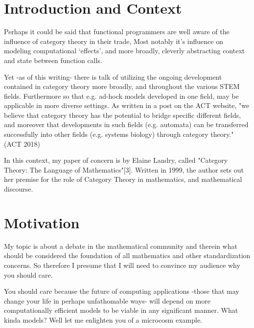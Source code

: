\section*{Introduction and Context}

Perhaps it could be said that functional programmers are well aware of the influence of category theory in their trade, Most notably it’s influence on modeling computational ‘effects’, and more broadly, cleverly abstracting context and state between function calls. 

Yet -as of this writing- there is talk of utilizing the ongoing development contained in category theory more broadly, and throughout the various STEM fields. Furthermore so that e.g. ad-hock models developed in one field, may be applicable in more diverse settings. As written in a post on the ACT website, "we believe that category theory has the potential to bridge specific different fields, and moreover that developments in such fields (e.g. automata) can be transferred successfully into other fields (e.g. systems biology) through category theory." (ACT 2018)

In this context, my paper of concern is by Elaine Landry, called "Category Theory: The Language of Mathematics"[3]. Written in 1999, the author sets out her premise for the role of Category Theory in mathematics, and mathematical discourse.

\section*{Motivation}

My topic is about a debate in the mathematical community and therein what should be considered the foundation of all mathematics and other standardization concerns. So therefore I presume that I will need to convince my audience why you should care.

You should care because the future of computing applications -those that may change your life in perhaps unfathomable ways- will depend on more computationally efficient models to be viable in any significant manner. What kinda models? Well let me enlighten you of a microcosm example.

